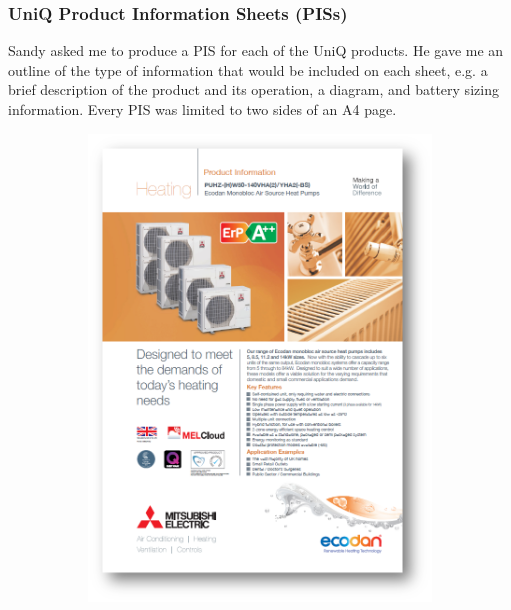 \subsubsection{UniQ Product Information Sheets (PISs)} \label{sec:piss}

Sandy asked me to produce a PIS for each of the UniQ products.
He gave me an outline of the type of information that would be included on each sheet, e.g. a brief description of the product and its operation, a diagram, and battery sizing information.
Every PIS was limited to two sides of an A4 page.

\begin{figure}
	\centering
	\begin{subfigure}{.19\textwidth}
		\centering
		\includegraphics[width=\textwidth]{figures/Mitsubishi01.png}

\end{subfigure}
\end{figure}
